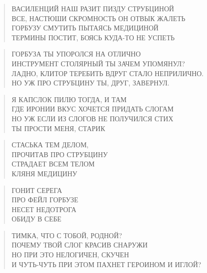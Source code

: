 \poemtitle{***}
\begin{verse}
ВАСИЛЕНЦИЙ НАШ РАЗИТ ПИЗДУ СТРУБЦИНОЙ\\
ВСЕ, НАСТЮШИ СКРОМНОСТЬ ОН ОТВЫК ЖАЛЕТЬ\\
ГОРБУЗУ СМУТИТЬ ПЫТАЯСЬ МЕДИЦИНОЙ\\
ТЕРМИНЫ ПОСТИТ, БОЯСЬ КУДА-ТО НЕ УСПЕТЬ
\end{verse}

\poemtitle{***}
\begin{verse}
ГОРБУЗА ТЫ УПОРОЛСЯ НА ОТЛИЧНО\\
ИНСТРУМЕНТ СТОЛЯРНЫЙ ТЫ ЗАЧЕМ УПОМЯНУЛ?\\
ЛАДНО, КЛИТОР ТЕРЕБИТЬ ВДРУГ СТАЛО НЕПРИЛИЧНО.\\
НО УЖ ПРО СТРУБЦИНУ ТЫ, ДРУГ, ЗАВЕРНУЛ.
\end{verse}

\poemtitle{***}
\begin{verse}
Я КАПСЛОК ПИЛЮ ТОГДА, И ТАМ\\
ГДЕ ИРОНИИ ВКУС ХОЧЕТСЯ ПРИДАТЬ СЛОГАМ\\
НО УЖ ЕСЛИ ИЗ СЛОГОВ НЕ ПОЛУЧИЛСЯ СТИХ\\
ТЫ ПРОСТИ МЕНЯ, СТАРИК
\end{verse}

\poemtitle{***}
\begin{verse}
СТАСЬКА ТЕМ ДЕЛОМ,\\
ПРОЧИТАВ ПРО СТРУБЦИНУ\\
СТРАДАЕТ ВСЕМ ТЕЛОМ\\
КЛЯНЯ МЕДИЦИНУ
\end{verse}

\poemtitle{***}
\begin{verse}
ГОНИТ СЕРЕГА\\
ПРО ФЕЙЛ ГОРБУЗЕ\\
НЕСЕТ НЕДОТРОГА\\
ОБИДУ В СЕБЕ
\end{verse}

\poemtitle{***}
\begin{verse}
ТИМКА, ЧТО С ТОБОЙ, РОДНОЙ?\\
ПОЧЕМУ ТВОЙ СЛОГ КРАСИВ СНАРУЖИ\\
НО ПРИ ЭТО НЕЛОГИЧЕН, СКУЧЕН\\
И ЧУТЬ-ЧУТЬ ПРИ ЭТОМ ПАХНЕТ ГЕРОИНОМ И ИГЛОЙ?
\end{verse}

